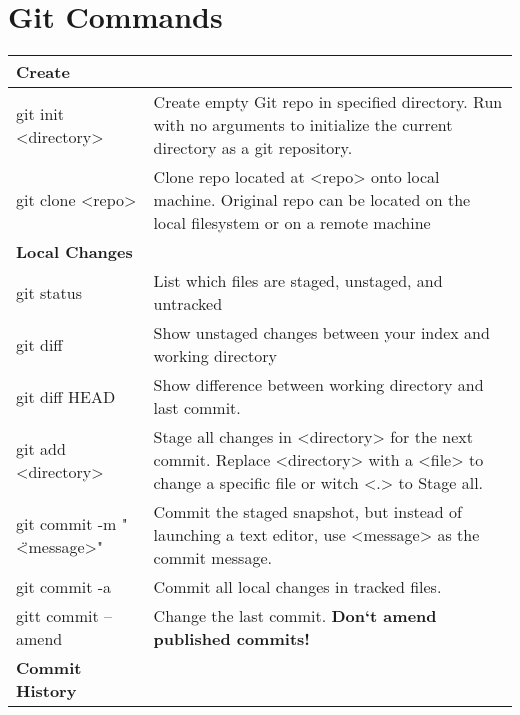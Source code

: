 \section{Git Commands}
\begin{longtable}{| p{} | p{} |}
    \hline 
    \textbf{Create}&
    \\ \hline
    
    git init <directory>&
    Create empty Git repo in specified directory. Run with no arguments to
    initialize the current directory as a git repository.
    \\ \hline 
    
    git clone <repo>& 
    Clone repo located at <repo> onto local machine. Original repo can be located on the local filesystem or on a remote machine
    \\ \hline  \hline
    
    \textbf{Local Changes}&
    \\ \hline 

    \hline 
    git status&
    List which files are staged, unstaged, and untracked  
    \\ \hline
    
    git diff& 
    Show unstaged changes between your index and working
    directory 
    \\ \hline 
    
    git diff HEAD&
    Show difference between working directory and last commit.
    \\ \hline
        
    git add <directory>&
    Stage all changes in <directory> for the next commit. Replace <directory>
    with a <file> to change a specific file or witch <.> to Stage all.
    \\ \hline 
    
    git commit -m " \" <message>"&
    Commit the staged snapshot, but instead of launching a text editor, use
    <message> as the commit message.
    \\ \hline
    
    git commit -a&
    Commit all local changes in tracked files.  
    \\ \hline 
    
    gitt commit --amend&
    Change the last commit. \textbf{Don‘t amend published commits!}
    \\ \hline \hline
    
    \textbf{Commit History}&  
    \\ \hline 


\end{longtable}
